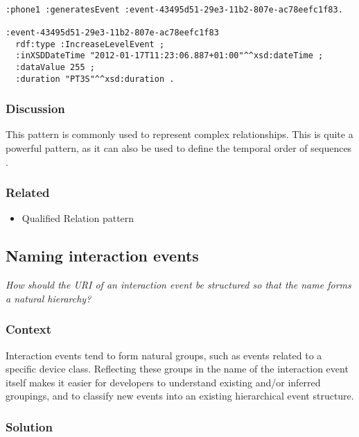 \begin{verbatim}
	
:phone1 :generatesEvent :event-43495d51-29e3-11b2-807e-ac78eefc1f83. 
	
:event-43495d51-29e3-11b2-807e-ac78eefc1f83 
  rdf:type :IncreaseLevelEvent ;
  :inXSDDateTime "2012-01-17T11:23:06.887+01:00"^^xsd:dateTime ;
  :dataValue 255 ;
  :duration "PT3S"^^xsd:duration .
\end{verbatim}


\subsubsection{Discussion}
This pattern is commonly used to represent complex relationships. This is quite a powerful pattern, as it can also be used to define the temporal order of sequences \cite{Noy2006}.


\subsubsection{Related}

\begin{itemize}
	\item Qualified Relation pattern \cite{Dodds2011}
\end{itemize}






\subsection{Naming interaction events}

\emph{How should the \ac{URI} of an interaction event be structured so that the name forms a natural hierarchy?}

\subsubsection{Context}

Interaction events tend to form natural groups, such as events related to a specific device class. Reflecting these groups in the name of the interaction event itself makes it easier for developers to understand existing and/or inferred groupings, and to classify new events into an existing hierarchical event structure.

\subsubsection{Solution}

